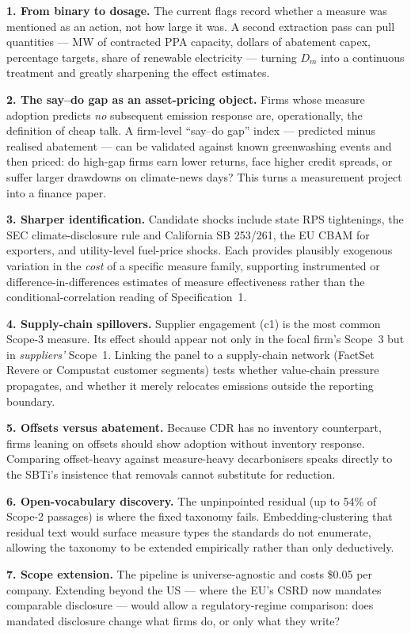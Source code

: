 \documentclass[11pt]{article}
\begin{document}
\textbf{1. From binary to dosage.} The current flags record whether a measure
was mentioned as an action, not how large it was. A second extraction pass can
pull quantities --- MW of contracted PPA capacity, dollars of abatement capex,
percentage targets, share of renewable electricity --- turning $D_m$ into a
continuous treatment and greatly sharpening the effect estimates.

\textbf{2. The say--do gap as an asset-pricing object.} Firms whose measure
adoption predicts \emph{no} subsequent emission response are, operationally,
the definition of cheap talk. A firm-level ``say--do gap'' index --- predicted
minus realised abatement --- can be validated against known greenwashing
events and then priced: do high-gap firms earn lower returns, face higher
credit spreads, or suffer larger drawdowns on climate-news days? This turns a
measurement project into a finance paper.

\textbf{3. Sharper identification.} Candidate shocks include state RPS
tightenings, the SEC climate-disclosure rule and California SB 253/261, the EU
CBAM for exporters, and utility-level fuel-price shocks. Each provides
plausibly exogenous variation in the \emph{cost} of a specific measure family,
supporting instrumented or difference-in-differences estimates of measure
effectiveness rather than the conditional-correlation reading of
Specification~1.

\textbf{4. Supply-chain spillovers.} Supplier engagement (c1) is the most
common Scope-3 measure. Its effect should appear not only in the focal firm's
Scope~3 but in \emph{suppliers'} Scope~1. Linking the panel to a supply-chain
network (FactSet Revere or Compustat customer segments) tests whether
value-chain pressure propagates, and whether it merely relocates emissions
outside the reporting boundary.

\textbf{5. Offsets versus abatement.} Because CDR has no inventory
counterpart, firms leaning on offsets should show adoption without inventory
response. Comparing offset-heavy against measure-heavy decarbonisers speaks
directly to the SBTi's insistence that removals cannot substitute for
reduction.

\textbf{6. Open-vocabulary discovery.} The unpinpointed residual (up to 54\%
of Scope-2 passages) is where the fixed taxonomy fails. Embedding-clustering
that residual text would surface measure types the standards do not enumerate,
allowing the taxonomy to be extended empirically rather than only deductively.

\textbf{7. Scope extension.} The pipeline is universe-agnostic and costs
\$0.05 per company. Extending beyond the US --- where the EU's CSRD now
mandates comparable disclosure --- would allow a regulatory-regime comparison:
does mandated disclosure change what firms do, or only what they write?
\end{document}
